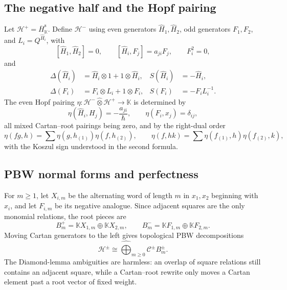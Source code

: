 \documentclass[11pt,a4paper]{article}
\newcommand{\hK}{\mathbb K}
\newcommand{\ot}{\otimes}
\newcommand{\hot}{\widehat\otimes}
\theoremstyle{definition}
\theoremstyle{remark}
\begin{document}
\subsection{The negative half and the Hopf pairing}

Let \(\mathcal H^+=\overline H_{\hK}^{\mathrm s}\).  Define
\(\mathcal H^-\) using even generators \(\widehat H_1,\widehat H_2\),
odd generators \(F_1,F_2\), and \(L_i=Q^{\widehat H_i}\), with
\[
 [\widehat H_1,\widehat H_2]=0,\qquad
 [\widehat H_i,F_j]=a_{ji}F_j,\qquad F_i^2=0,
\]
and
\begin{equation}\label{eq:negative-Hopf}
\begin{aligned}
 \Delta(\widehat H_i)&=\widehat H_i\ot1+1\ot\widehat H_i,&
 S(\widehat H_i)&=-\widehat H_i,\\
 \Delta(F_i)&=F_i\ot L_i+1\ot F_i,&
 S(F_i)&=-F_iL_i^{-1}.
\end{aligned}
\end{equation}
The even Hopf pairing
\(\eta:\mathcal H^-\hot\mathcal H^+\to\hK\) is determined by
\begin{equation}\label{eq:eta-generators}
 \eta(\widehat H_i,H_j)=-\frac{a_{ji}}{\hbar},
 \qquad
 \eta(F_i,x_j)=\delta_{ij},
\end{equation}
all mixed Cartan--root pairings being zero, and by the right-dual order
\begin{equation}\label{eq:eta-extension}
\eta(fg,h)=\sum\eta(g,h_{(1)})\eta(f,h_{(2)}),\qquad
\eta(f,hk)=\sum\eta(f_{(1)},h)\eta(f_{(2)},k),
\end{equation}
with the Koszul sign understood in the second formula.

\subsection{PBW normal forms and perfectness}\label{sec:completion}

For \(m\geq1\), let \(X_{i,m}\) be the alternating word of length \(m\)
in \(x_1,x_2\) beginning with \(x_i\), and let \(F_{i,m}\) be its
negative analogue.  Since adjacent squares are the only monomial
relations, the root pieces are
\[
 B_m^+=\hK X_{1,m}\oplus\hK X_{2,m},\qquad
 B_m^-=\hK F_{1,m}\oplus\hK F_{2,m}.
\]
Moving Cartan generators to the left gives topological PBW decompositions
\[
 \mathcal H^\pm
 \cong\widehat{\bigoplus}_{m\geq0}\mathcal C^\pm B_m^\pm.
\]
The Diamond-lemma ambiguities are harmless: an overlap of square
relations still contains an adjacent square, while a Cartan--root rewrite
only moves a Cartan element past a root vector of fixed weight.
\end{document}
